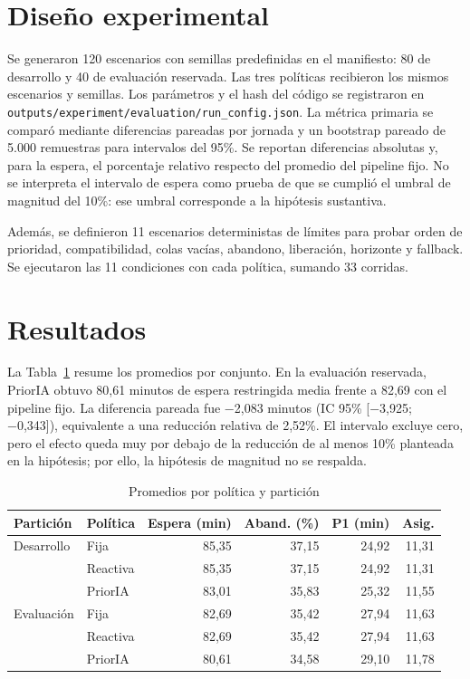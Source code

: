 \documentclass[conference]{IEEEtran}
\begin{document}
\section{Diseño experimental}
Se generaron 120 escenarios con semillas predefinidas en el manifiesto: 80 de desarrollo y 40 de evaluación reservada. Las tres políticas recibieron los mismos escenarios y semillas. Los parámetros y el hash del código se registraron en \texttt{outputs/experiment/evaluation/run\_config.json}. La métrica primaria se comparó mediante diferencias pareadas por jornada y un bootstrap pareado de 5.000 remuestras para intervalos del 95\%. Se reportan diferencias absolutas y, para la espera, el porcentaje relativo respecto del promedio del pipeline fijo. No se interpreta el intervalo de espera como prueba de que se cumplió el umbral de magnitud del 10\%: ese umbral corresponde a la hipótesis sustantiva.

Además, se definieron 11 escenarios deterministas de límites para probar orden de prioridad, compatibilidad, colas vacías, abandono, liberación, horizonte y fallback. Se ejecutaron las 11 condiciones con cada política, sumando 33 corridas.

\section{Resultados}
La Tabla~\ref{tab:means} resume los promedios por conjunto. En la evaluación reservada, PriorIA obtuvo 80,61 minutos de espera restringida media frente a 82,69 con el pipeline fijo. La diferencia pareada fue −2,083 minutos (IC 95\% [−3,925; −0,343]), equivalente a una reducción relativa de 2,52\%. El intervalo excluye cero, pero el efecto queda muy por debajo de la reducción de al menos 10\% planteada en la hipótesis; por ello, la hipótesis de magnitud no se respalda.

\begin{table}[t]
\caption{Promedios por política y partición}
\label{tab:means}
\centering
\small
\begin{tabular}{llrrrr}
\toprule
Partición & Política & Espera (min) & Aband. (\%) & P1 (min) & Asig. \\
\midrule
Desarrollo & Fija & 85,35 & 37,15 & 24,92 & 11,31 \\
 & Reactiva & 85,35 & 37,15 & 24,92 & 11,31 \\
 & PriorIA & 83,01 & 35,83 & 25,32 & 11,55 \\
Evaluación & Fija & 82,69 & 35,42 & 27,94 & 11,63 \\
 & Reactiva & 82,69 & 35,42 & 27,94 & 11,63 \\
 & PriorIA & 80,61 & 34,58 & 29,10 & 11,78 \\
\bottomrule
\end{tabular}
\end{table}
\end{document}
